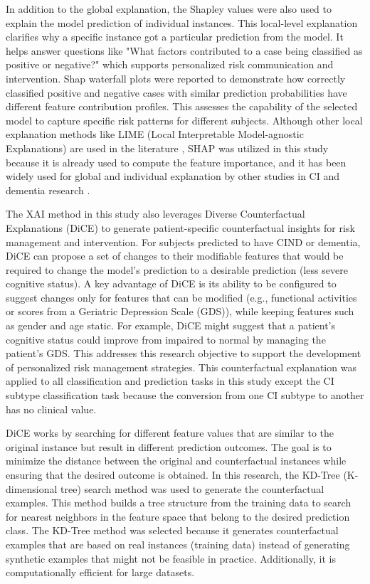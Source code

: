 In addition to the global explanation, the Shapley values were also used to explain the model prediction of individual instances. This local-level explanation clarifies why a specific instance got a particular prediction from the model. It helps answer questions like "What factors contributed to a case being classified as positive or negative?" which supports personalized risk communication and intervention. Shap waterfall plots were reported to demonstrate how correctly classified positive and negative cases with similar prediction probabilities have different feature contribution profiles. This assesses the capability of the selected model to capture specific risk patterns for different subjects. Although other local explanation methods like \acrshort{LIME} (Local Interpretable Model-agnostic Explanations) are used in the literature \cite{abbas2024Explainable, Vyas2022Identifying}, SHAP was utilized in this study because it is already used to compute the feature importance, and it has been widely used for global and individual explanation by other studies in CI and dementia research \cite{Beebe-Wang2021Efficient, Danso2021Developing, Yue2023Explainable}.

The XAI method in this study also leverages Diverse Counterfactual Explanations (\acrshort{DiCE}) \cite{Mothilal2019Explaining} to generate patient-specific counterfactual insights for risk management and intervention. For subjects predicted to have CIND or dementia, DiCE can propose a set of changes to their modifiable features that would be required to change the model's prediction to a desirable prediction (less severe cognitive status). A key advantage of DiCE is its ability to be configured to suggest changes only for features that can be modified (e.g., functional activities or scores from a Geriatric Depression Scale (\acrshort{GDS})), while keeping features such as gender and age static. For example, DiCE might suggest that a patient's cognitive status could improve from impaired to normal by managing the patient's GDS. This addresses this research objective to support the development of personalized risk management strategies. This counterfactual explanation was applied to all classification and prediction tasks in this study except the CI subtype classification task because the conversion from one CI subtype to another has no clinical value.

DiCE works by searching for different feature values that are similar to the original instance but result in different prediction outcomes. The goal is to minimize the distance between the original and counterfactual instances while ensuring that the desired outcome is obtained. In this research, the \acrshort{KD-Tree} (K-dimensional tree) search method was used to generate the counterfactual examples. This method builds a tree structure from the training data to search for nearest neighbors in the feature space that belong to the desired prediction class. The KD-Tree method was selected because it generates counterfactual examples that are based on real instances (training data) instead of generating synthetic examples that might not be feasible in practice. Additionally, it is computationally efficient for large datasets.

